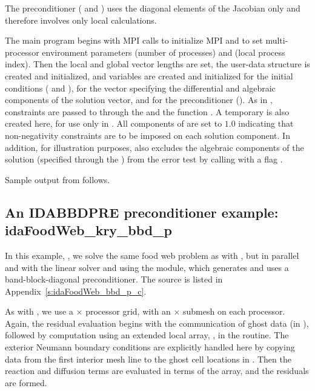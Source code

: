 The preconditioner ( and ) uses the diagonal 
elements of the Jacobian only and therefore involves only local calculations.

The  main program begins with MPI calls to initialize MPI and to
set multi-processor environment parameters  (number of processes) and
 (local process index).  Then the local and global vector lengths
are set, the user-data structure  is created and initialized, and
 variables are created and initialized for the initial conditions
( and ), for the vector  specifying the differential 
and algebraic components of the solution vector, and for the preconditioner
().  As in , constraints are passed to {\ida} through the
  and the function .  
A temporary   is also created here, for use only in
.
All components of  are set to $1.0$ indicating that
non-negativity constraints are to be imposed on each solution component.  
In addition, for illustration purposes,  also excludes the
algebraic components of the solution (specified through the 
) from the error test by calling  with a
flag .

Sample output from  follows.


\subsection{An IDABBDPRE preconditioner example: idaFoodWeb\_kry\_bbd\_p}\label{ss:idaFoodWeb_bbd_p}

In this example, , we solve the same food web problem as with
, but in parallel and with the {\idaspgmr} linear solver and
using the {\idabbdpre} module, which generates and uses a band-block-diagonal 
preconditioner.  The source is listed in Appendix~\ref{s:idaFoodWeb_bbd_p_c}.

As with , we use a  $\times$  processor grid, with
an  $\times$  submesh on each processor.  Again, the residual
evaluation begins with the communication of ghost data (in ),
followed by computation using an extended local array, , in the
 routine.
The exterior Neumann boundary conditions are explicitly handled here
by copying data from the first interior mesh line to the ghost cell
locations in .  Then the reaction and diffusion terms are
evaluated in terms of the  array, and the residuals are formed.

